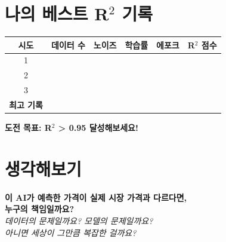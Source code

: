 \documentclass[11pt, a4paper]{article}
\begin{document}
\section{나의 베스트 R$^2$ 기록}

\begin{center}
\begin{tabular}{cccccc}
    \toprule
    \textbf{시도} & \textbf{데이터 수} & \textbf{노이즈} & \textbf{학습률} & \textbf{에포크} & \textbf{R$^2$ 점수} \\
    \midrule
    1 & \hspace{1.5cm} & \hspace{1.2cm} & \hspace{1.2cm} & \hspace{1.2cm} & \hspace{1.5cm} \\[0.5cm]
    2 & & & & & \\[0.5cm]
    3 & & & & & \\[0.5cm]
    \midrule
    \textbf{최고 기록} & & & & & \\[0.3cm]
    \bottomrule
\end{tabular}
\end{center}

\vspace{0.5cm}

\begin{center}
\textbf{도전 목표: R$^2$ > 0.95 달성해보세요!}
\end{center}

\section{생각해보기}

\begin{tcolorbox}[colback=blue!5, colframe=blueprimary, boxrule=1pt]
\begin{center}
\textbf{\large 이 AI가 예측한 가격이 실제 시장 가격과 다르다면,\\[0.3cm]
누구의 책임일까요?}\\[0.5cm]
\textit{데이터의 문제일까요? 모델의 문제일까요?\\
아니면 세상이 그만큼 복잡한 걸까요?}
\end{center}
\end{tcolorbox}
\end{document}

